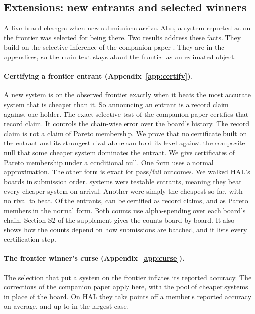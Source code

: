 \documentclass[11pt]{article}
\begin{document}
\subsection{Extensions: new entrants and selected winners}
\label{sec:extensions}
A live board changes when new submissions arrive. Also, a system reported as on the frontier was selected for being there. Two results address these facts. They build on the selective inference of the companion paper \citep{opoku2026records}. They are in the appendices, so the main text stays about the frontier as an estimated object.

\paragraph{Certifying a frontier entrant (Appendix~\ref{app:certify}).}
A new system is on the observed frontier exactly when it beats the most accurate system that is cheaper than it. So announcing an entrant is a record claim against one holder. The exact selective test of the companion paper certifies that record claim. It controls the chain-wise error over the board's history. The record claim is not a claim of Pareto membership. We prove that no certificate built on the entrant and its strongest rival alone can hold its level against the composite null that some cheaper system dominates the entrant. We give certificates of Pareto membership under a conditional null. One form uses a normal approximation. The other form is exact for pass/fail outcomes. We walked HAL's boards in submission order. \NumCertEntrants{} systems were testable entrants, meaning they beat every cheaper system on arrival. Another \NumCertCheapest{} were simply the cheapest so far, with no rival to beat. Of the entrants, \NumCertSpending{} can be certified as record claims, and \NumCertIUSpending{} as Pareto members in the normal form. Both counts use alpha-spending over each board's chain. Section S2 of the supplement gives the counts board by board. It also shows how the counts depend on how submissions are batched, and it lists every certification step.

\paragraph{The frontier winner's curse (Appendix~\ref{app:curse}).}
The selection that put a system on the frontier inflates its reported accuracy. The corrections of the companion paper apply here, with the pool of cheaper systems in place of the board. On HAL they take \NumCurseMeanShrinkPt{} points off a member's reported accuracy on average, and up to \NumCurseMaxShrinkPt{} in the largest case.
\end{document}
